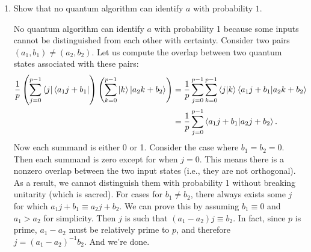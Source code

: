 \documentclass{article}
\theoremstyle{definition}
\newcommand{\f}[2]{\frac{#1}{#2}}
\newcommand{\lp}{\left(}
\newcommand{\rp}{\right)}
\begin{document}
\begin{enumerate}[label=(\alph*)]
\item Show that no quantum algorithm can identify $a$ with probability $1$.

\noindent No quantum algorithm can identify $a$ with probability 1 because some inputs cannot be distinguished from each other with certainty. Consider two pairs $(a_1, b_1) \neq (a_2, b_2)$. Let us compute the overlap between two quantum states associated with these pairs:
\begin{align*}
	\f{1}{p}\lp \sum_{j=0}^{p-1} \bra{j} \bra{a_1 j + b_1}  \rp \lp \sum_{k=0}^{p-1} \ket{k} \ket{a_2 k + b_2}  \rp 
	&= \f{1}{p} \sum_{j=0}^{p-1} \sum_{k=0}^{p-1} \bra{j}\ket{k} \bra{a_1 j + b_1} \ket{a_2 k + b_2} \\
	&= \f{1}{p} \sum_{j=0}^{p-1}  \bra{a_1 j + b_1} \ket{a_2 j + b_2}.
\end{align*}
Now each summand is either 0 or 1. Consider the case where $b_1 = b_2 = 0$. Then each summand is zero except for when $j=0$. This means there is a nonzero overlap between the two input states (i.e., they are not orthogonal). As a result, we cannot distinguish them with probability 1 without breaking unitarity (which is sacred). For cases for $b_1 \neq b_2$, there always exists some $j$ for which $a_1 j + b_1 \equiv a_2 j + b_2$. We can prove this by assuming $b_1 \equiv 0$ and $a_1 > a_2$ for simplicity. Then $j$ is such that $(a_1 - a_2) j \equiv b_2$. In fact, since $p$ is prime, $a_1 - a_2$ must be relatively prime to $p$, and therefore $j = (a_1 - a_2)^{-1} b_2$. And we're done. 


\end{enumerate}
\end{document}
